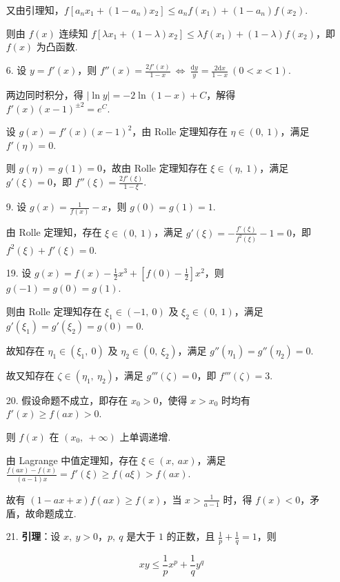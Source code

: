 \documentclass[oneside]{ctexbook} %
\begin{document}
\begin{enumerate}
    又由引理知，$f[ a_n x_1 + (1-a_n) x_2 ] \leqslant a_nf(x_1) + (1-a_n)f(x_2)$.
    
    则由 $f(x)$ 连续知 $f[ \lambda x_1 + (1-\lambda) x_2 ] \leqslant \lambda f(x_1) + (1-\lambda)f(x_2)$，即 $f(x)$ 为凸函数.
    \item[6.]
    设 $y = f'(x)$，则 $f''(x) = \frac{2f'(x)}{1-x} \ \Leftrightarrow \ \frac {\mathrm dy} y = \frac {2\mathrm dx} {1-x} \ (0 < x < 1)$.
    
    两边同时积分，得 $\left| \ln y \right| = -2 \ln(1-x) + C$，解得 $f'(x)(x-1)^{\pm 2} = e^C$.
    
    设 $g(x) = f'(x)(x-1)^2$，由 Rolle 定理知存在 $\eta \in (0,\ 1)$，满足 $f'(\eta) = 0$.
    
    则 $g(\eta) = g(1) = 0$，故由 Rolle 定理知存在 $\xi \in (\eta,\ 1)$，满足 $g'(\xi) = 0$，即 $f''(\xi) = \frac{2f'(\xi)}{1-\xi}$.
    \item[9.]
    设 $g(x) = \frac 1 {f(x)} - x$，则 $g(0) = g(1) = 1$.
    
    由 Rolle 定理知，存在 $\xi \in (0,\ 1)$，满足 $g'(\xi) = - \frac{f'(\xi)}{f^2(\xi)} - 1 = 0$，即 $f^2(\xi) + f'(\xi) = 0$.
    \item[19.]
    设 $g(x) = f(x) - \frac 1 2 x^3 + \left[ f(0) - \frac 1 2 \right] x^2$，则 $g(-1) = g(0) = g(1)$.
    
    则由 Rolle 定理知存在 $\xi_1 \in (-1,\ 0)$ 及 $\xi_2 \in (0,\ 1)$，满足 $g'(\xi_1) = g'(\xi_2) = g(0) = 0$.
    
    故知存在 $\eta_1 \in (\xi_1,\ 0)$ 及 $\eta_2 \in (0,\ \xi_2)$，满足 $g''(\eta_1) = g''(\eta_2) = 0$.
    
    故又知存在 $\zeta \in (\eta_1,\ \eta_2)$，满足 $g'''(\zeta) = 0$，即 $f'''(\zeta) = 3$.
    \item[20.]
    假设命题不成立，即存在 $x_0 > 0$，使得 $x > x_0$ 时均有 $f'(x) \geqslant f(ax) > 0$.
    
    则 $f(x)$ 在 $(x_0,\ +\infty)$ 上单调递增.
    
    由 Lagrange 中值定理知，存在 $\xi \in (x,\ ax)$，满足 $\frac{f(ax)-f(x)}{(a-1)x} = f'(\xi) \geqslant f(a\xi) > f(ax)$.
    
    故有 $(1-ax+x)f(ax) \geqslant f(x)$，当 $x > \frac 1 {a-1}$ 时，得 $f(x) < 0$，矛盾，故命题成立.
    \item[21.]
    \textbf{引理}：设 $x,\ y > 0$，$p,\ q$ 是大于 $1$ 的正数，且 $\frac 1 p + \frac 1 q = 1$，则
    
    $$
    xy \leqslant \frac 1 p x^p + \frac 1 q y^q
    $$
    

\end{enumerate}
\end{document}
